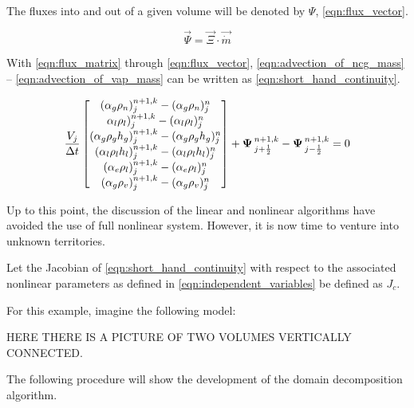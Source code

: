 The fluxes into and out of a given volume will be denoted by $\Psi$, \eqref{eqn:flux_vector}.

\begin{equation}
\label{eqn:flux_vector}
\vec{\Psi} = \vec{\Xi} \cdot \vec{\dot{m}}
\end{equation}


With \eqref{eqn:flux_matrix} through \eqref{eqn:flux_vector}, \eqref{eqn:advection_of_ncg_mass} -- \eqref{eqn:advection_of_vap_mass} can be written as \eqref{eqn:short_hand_continuity}.

\begin{equation}
\label{eqn:short_hand_continuity}
\frac{V_j}{\dt} \begin{bmatrix}
(\alpha_{g} \rho_{n})^{n+1, k}_{j} - (\alpha_{g} \rho_{n})^{n}_{j} \\
\alpha_{l} \rho_{l})^{n+1, k}_{j} - (\alpha_{l} \rho_{l})^{n}_{j} \\
(\alpha_{g} \rho_{g} h_{g})^{n+1, k}_{j} - (\alpha_{g} \rho_g h_{g})^{n}_{j}  \\
(\alpha_{l} \rho_{l} h_{l})^{n+1, k}_{j} - (\alpha_{l} \rho_{l} h_{l} )^{n}_{j} \\
(\alpha_{e} \rho_{l})^{n+1, k}_{j} - (\alpha_{e} \rho_{l})^{n}_{j} \\
(\alpha_{g} \rho_{v})^{n+1, k}_{j} - (\alpha_{g} \rho_{v})^{n}_{j} 
\end{bmatrix} + \vec{\Psi}^{n+1, k}_{j + \onehalf} - \vec{\Psi}^{n+1, k}_{j - \onehalf}= 0
\end{equation}

Up to this point, the discussion of the linear and nonlinear algorithms have avoided the use of full nonlinear system.
However, it is now time to venture into unknown territories.

Let the Jacobian of \eqref{eqn:short_hand_continuity} with respect to the associated nonlinear parameters as defined in \eqref{eqn:independent_variables} be defined as $J_{c}$.

For this example, imagine the following model:

HERE THERE IS A PICTURE OF TWO VOLUMES VERTICALLY CONNECTED.

The following procedure will show the development of the domain decomposition algorithm.

